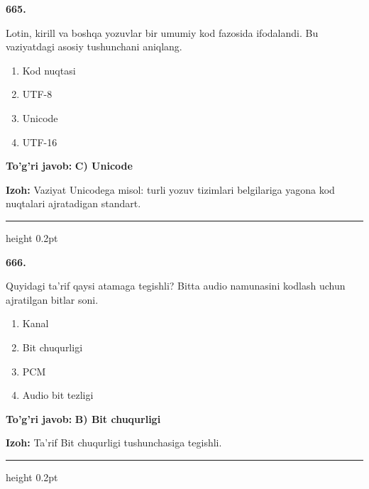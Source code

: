 \documentclass[10pt,a4paper,oneside]{article}
\begin{document}
\noindent\textbf{\color{ink}665.}
\par
Lotin, kirill va boshqa yozuvlar bir umumiy kod fazosida ifodalandi. Bu vaziyatdagi asosiy tushunchani aniqlang.
\begin{enumerate}[label=\Alph*),leftmargin=9mm]
\item Kod nuqtasi
\item UTF-8
\item Unicode
\item UTF-16
\end{enumerate}
\begin{tcolorbox}[enhanced,breakable,colback=teal!4,colframe=teal!50!black,boxrule=0.5pt,arc=1.1mm,left=3mm,right=3mm,top=1.7mm,bottom=1.7mm,before skip=2mm,after skip=2mm]
\textbf{\color{teal}To'g'ri javob:} \textbf{C) Unicode}
\par\smallskip
\textbf{Izoh:} Vaziyat Unicodega misol: turli yozuv tizimlari belgilariga yagona kod nuqtalari ajratadigan standart.
\end{tcolorbox}
\vspace{2mm}\hrule height 0.2pt \vspace{3mm}

\noindent\textbf{\color{ink}666.}
\par
Quyidagi ta'rif qaysi atamaga tegishli? Bitta audio namunasini kodlash uchun ajratilgan bitlar soni.
\begin{enumerate}[label=\Alph*),leftmargin=9mm]
\item Kanal
\item Bit chuqurligi
\item PCM
\item Audio bit tezligi
\end{enumerate}
\begin{tcolorbox}[enhanced,breakable,colback=teal!4,colframe=teal!50!black,boxrule=0.5pt,arc=1.1mm,left=3mm,right=3mm,top=1.7mm,bottom=1.7mm,before skip=2mm,after skip=2mm]
\textbf{\color{teal}To'g'ri javob:} \textbf{B) Bit chuqurligi}
\par\smallskip
\textbf{Izoh:} Ta'rif Bit chuqurligi tushunchasiga tegishli.
\end{tcolorbox}
\vspace{2mm}\hrule height 0.2pt \vspace{3mm}
\end{document}
